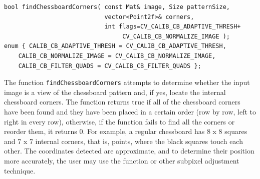 \begin{lstlisting}
bool findChessboardCorners( const Mat& image, Size patternSize,
                            vector<Point2f>& corners,
                            int flags=CV_CALIB_CB_ADAPTIVE_THRESH+
                                 CV_CALIB_CB_NORMALIZE_IMAGE );
enum { CALIB_CB_ADAPTIVE_THRESH = CV_CALIB_CB_ADAPTIVE_THRESH,
    CALIB_CB_NORMALIZE_IMAGE = CV_CALIB_CB_NORMALIZE_IMAGE,
    CALIB_CB_FILTER_QUADS = CV_CALIB_CB_FILTER_QUADS };
\end{lstlisting}
\begin{description}
\end{description}

The function \texttt{findChessboardCorners} attempts to determine
whether the input image is a view of the chessboard pattern and, if yes,
locate the internal chessboard corners. The function returns true if all
of the chessboard corners have been found and they have been placed
in a certain order (row by row, left to right in every row),
otherwise, if the function fails to find all the corners or reorder
them, it returns 0. For example, a regular chessboard has 8 x 8
squares and 7 x 7 internal corners, that is, points, where the black
squares touch each other. The coordinates detected are approximate,
and to determine their position more accurately, the user may use
the function  or other subpixel adjustment technique.

